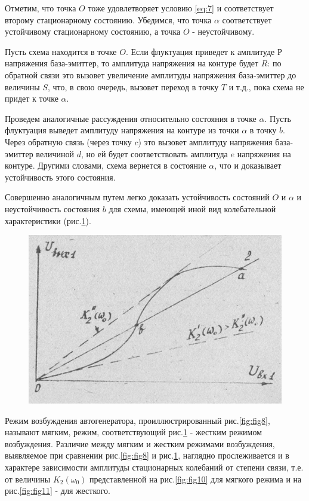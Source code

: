 Отметим, что точка $O$ тоже удовлетворяет условию \eqref{eq:7} и соответствует второму стационарному состоянию. Убедимся, что точка $\alpha$ соответствует устойчивому стационарному состоянию, а точка $O$ - неустойчивому.

Пусть схема находится в точке $O$. Если флуктуация приведет к амплитуде $Р$ напряжения база-эмиттер, то амплитуда напряжения на контуре будет $R$: по обратной связи это вызовет увеличение амплитуды напряжения база-эмиттер до величины $S$, что, в свою очередь, вызовет переход в точку $T$ и т.д., пока схема не придет к точке $\alpha$.

Проведем аналогичные рассуждения относительно состояния в точке $\alpha$. Пусть флуктуация выведет амплитуду напряжения на контуре из точки $\alpha$ в точку $b$. Через обратную связь (через точку $c$) это вызовет амплитуду напряжения база-эмиттер величиной $d$, но ей будет соответствовать амплитуда $e$ напряжения на контуре. Другими словами, схема вернется в состояние $\alpha$, что и доказывает устойчивость этого состояния.

Совершенно аналогичным путем легко доказать устойчивость состояний $O$ и $\alpha$ и неустойчивость состояния $b$ для схемы, имеющей иной вид колебательной характеристики (рис.\ref{fig:fig9}).

\begin{figure}[h]
	\centering
	\includegraphics[width=0.4\linewidth]{circuit/9.jpg}
	\caption{}
	\label{fig:fig9}
\end{figure}

Режим возбуждения автогенератора, проиллюстрированный рис.\ref{fig:fig8}, называют мягким, режим, соответствующий рис.\ref{fig:fig9} - жестким режимом возбуждения. Различие между мягким и жестким режимами возбуждения, выявляемое при сравнении рис.\ref{fig:fig8} и рис.\ref{fig:fig9}, наглядно прослеживается и в характере зависимости амплитуды стационарных колебаний от степени связи, т.е. от величины $K_2(\omega_0)$ представленной на рис.\ref{fig:fig10} для мягкого режима и на рис.\ref{fig:fig11} - для жесткого.

